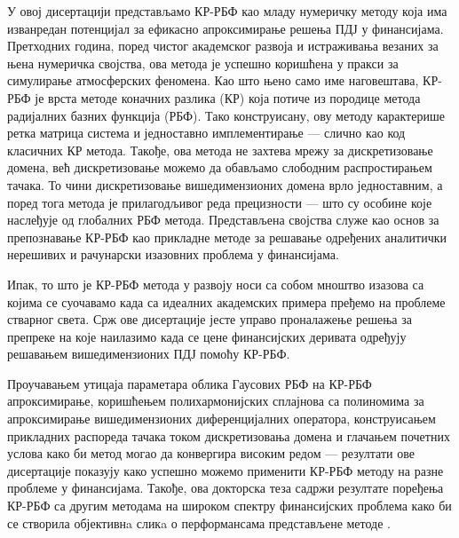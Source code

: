 \documentclass{UUThesisTemplate}
\begin{document}
\begin{serbian}
{\par
У овој дисертацији представљамо КР-РБФ као младу нумеричку методу која има изванредан потенцијал за ефикасно апроксимирање решења ПДЈ у финансијама. Претходних година, поред чистог академског развоја и истраживања везаних за њена нумеричка својства, ова метода је успешно коришћена у пракси за симулирање атмосферских феномена. Као што њено само име наговештава, КР-РБФ је врста методе коначних разлика (КР) која потиче из породице метода радијалних базних функција (РБФ). %
Тако конструисану, ову методу карактерише ретка матрица система и једноставно имплементирање --- слично као код класичних КР метода. Такође, ова метода не захтева мрежу за дискретизовање домена, већ дискретизовање можемо да обављамо слободним распростирањем тачака. То чини дискретизовање вишедимензионих домена врло једноставним, а поред тога метода је прилагодљивог реда прецизности --- што су особине које наслеђује од глобалних РБФ метода. Представљена својства служе као основ за препознавање КР-РБФ као прикладне методе за решавање одређених аналитички нерешивих и рачунарски изазовних проблема у финансијама.
\par
Ипак, то што је КР-РБФ метода у развоју носи са собом мноштво изазова са којима се суочавамо када са идеалних академских примера пређемо на проблеме стварног света. Срж ове дисертације јесте управо проналажење решења за препреке на које наилазимо када се цене финансијских деривата одређују решавањем вишедимензионих ПДЈ помоћу КР-РБФ. 

\par 
Проучавањем утицаја параметара облика Гаусових РБФ на КР-РБФ апроксимирање, коришћењем полихармонијских сплајнова са полиномима за апроксимирање вишедимензионих диференцијалних оператора, конструисањем прикладних распореда тачака током дискретизовања домена и глачањем почетних услова како би метод могао да конвергира високим редом --- резултати ове дисертације показују како успешно можемо применити КР-РБФ методу на разне проблеме у финансијама. Такође, ова докторска теза садржи резултате поређења КР-РБФ са другим методама на широком спектру финансијских проблема како би се створила објективнa сликa о перформансама представљене методе .

}
\end{serbian}
\end{document}
